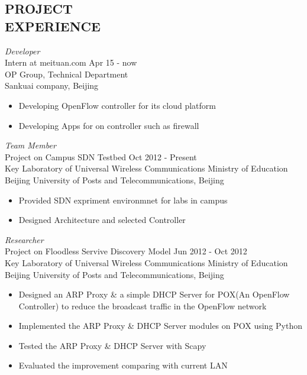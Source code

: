 \documentclass[margin]{res}
\begin{document}
\begin{resume}
 
\section{PROJECT \\ EXPERIENCE} 
    {\sl Developer} \\
        Intern at meituan.com
        \hfill Apr 15 - now \\
        OP Group, Technical Department \\
        Sankuai company, Beijing
        \begin{itemize}
            \itemsep -2pt %
            \item Developing OpenFlow controller for its cloud platform
            \item Developing Apps for on controller such as firewall
        \end{itemize} 

    {\sl Team Member} \\
        Project on Campus SDN Testbed
        \hfill Oct 2012 - Present \\
        Key Laboratory of Universal Wireless Communications Ministry of Education \\
        Beijing University of Posts and Telecommunications, Beijing
        \begin{itemize}
            \itemsep -2pt %
            \item Provided SDN expriment environmnet for labs in campus
            \item Designed Architecture and selected Controller
        \end{itemize}

    {\sl Researcher} \\
        Project on Floodless Servive Discovery Model
        \hfill Jun 2012 - Oct 2012 \\ 
        Key Laboratory of Universal Wireless Communications Ministry of Education \\
        Beijing University of Posts and Telecommunications, Beijing
        \begin{itemize}
            \itemsep -2pt %
            \item Designed an ARP Proxy \& a simple DHCP Server for POX(An OpenFlow Controller) to reduce the broadcast traffic in the OpenFlow network
            \item Implemented the ARP Proxy \& DHCP Server modules on POX using Python
            \item Tested the ARP Proxy \& DHCP Server with Scapy
            \item Evaluated the improvement comparing with current LAN 
        \end{itemize}                     


\end{resume}
\end{document}
